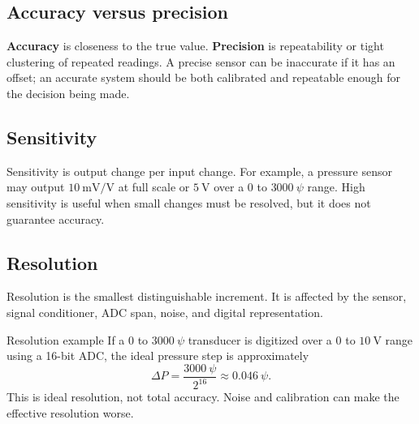\documentclass[11pt]{article}
\newcommand{\mV}{\mathrm{mV}}
\newcommand{\V}{\mathrm{V}}
\begin{document}
\subsection{Accuracy versus precision}
\textbf{Accuracy} is closeness to the true value. \textbf{Precision} is
repeatability or tight clustering of repeated readings. A precise sensor can be
inaccurate if it has an offset; an accurate system should be both calibrated and
repeatable enough for the decision being made.

\begin{center}
\end{center}

\subsection{Sensitivity}
Sensitivity is output change per input change. For example, a pressure sensor
may output \(10~\mV/\V\) at full scale or \(5~\V\) over a \(0\) to
\(3000~\psi\) range. High sensitivity is useful when small changes must be
resolved, but it does not guarantee accuracy.

\subsection{Resolution}
Resolution is the smallest distinguishable increment. It is affected by the
sensor, signal conditioner, ADC span, noise, and digital representation.

\begin{examplebox}{Resolution example}
If a \(0\) to \(3000~\psi\) transducer is digitized over a \(0\) to \(10~\V\)
range using a 16-bit ADC, the ideal pressure step is approximately
\[
\Delta P = \frac{3000~\psi}{2^{16}} \approx 0.046~\psi.
\]
This is ideal resolution, not total accuracy. Noise and calibration can make the
effective resolution worse.
\end{examplebox}
\end{document}
